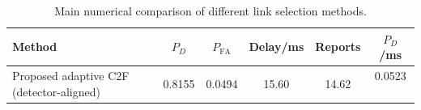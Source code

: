 \begin{table}[t]
    \centering
    \caption{Main numerical comparison of different link selection methods.}
    \label{tab:main_summary}
    \begin{tabular}{l c c c c c}
        \hline
        Method & $P_D$ & $P_{\mathrm{FA}}$ & Delay/ms & Reports & $P_D$/ms \\
        \hline
        Proposed adaptive C2F (detector-aligned) & 0.8155 & 0.0494 & 15.60 & 14.62 & 0.0523 \
        \hline
    \end{tabular}
\end{table}
